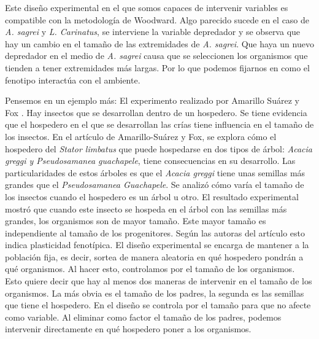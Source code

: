  \begin{center}
 \end{center}

 Este diseño experimental en el que somos capaces de intervenir variables es compatible con la metodología de Woodward. Algo parecido sucede en el caso de \emph{A. sagrei} y \emph{L. Carinatus}, se interviene la variable depredador y se observa que hay un cambio en el tamaño de las extremidades de \emph{A. sagrei}. Que haya un nuevo depredador en el medio de \emph{A. sagrei} causa que se seleccionen los organismos que tienden a tener extremidades más largas. Por lo que podemos fijarnos en como el fenotipo interactúa con el ambiente.

Pensemos en un ejemplo más: El experimento realizado por Amarillo Suárez y Fox \citeyear{Amarillo-Suarez2006}. Hay insectos que se desarrollan dentro de un hospedero. Se tiene evidencia que el hospedero en el que se desarrollan las crías tiene influencia en el tamaño de los insectos. En el artículo de Amarillo-Suárez y Fox, se explora cómo el hospedero del \emph{Stator limbatus} que puede hospedarse en dos tipos de árbol: \emph{Acacia greggi y Pseudosamanea guachapele}, tiene consecuencias en su desarrollo. Las particularidades de estos árboles es que el \emph{Acacia greggi} tiene unas semillas más grandes que el \emph{Pseudosamanea Guachapele}. Se analizó cómo varía el tamaño de los insectos cuando el hospedero es un árbol u otro. El resultado experimental mostró que cuando este insecto se hospeda en el árbol con las semillas más grandes, los organismos son de mayor tamaño. Este mayor tamaño es independiente al tamaño de los progenitores. Según las autoras del artículo esto indica plasticidad fenotípica. El diseño experimental se encarga de mantener a la población fija, es decir, sortea de manera aleatoria en qué hospedero pondrán a qué organismos. Al hacer esto, controlamos por el tamaño de los organismos. Esto quiere decir que hay al menos dos maneras de intervenir en el tamaño de los organismos. La más obvia es el tamaño de los padres, la segunda es las semillas que tiene el hospedero. En el diseño se controla por el tamaño para que no afecte como variable. Al eliminar como factor el tamaño de los padres, podemos intervenir directamente en qué hospedero poner a los organismos.


